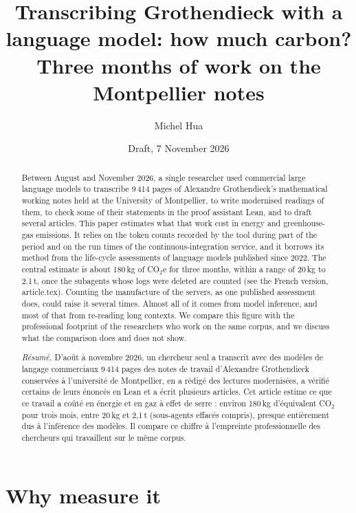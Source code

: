 \documentclass[11pt,a4paper]{article}
\title{Transcribing Grothendieck with a language model: how much carbon?\\
\large Three months of work on the Montpellier notes}
\author{Michel Hua}
\date{Draft, 7 November 2026}
\begin{document}
\maketitle

\begin{abstract}
Between August and November 2026, a single researcher used commercial large language models to transcribe 9\,414 pages of Alexandre Grothendieck's mathematical working notes held at the University of Montpellier, to write modernised readings of them, to check some of their statements in the proof assistant Lean, and to draft several articles. This paper estimates what that work cost in energy and greenhouse-gas emissions. It relies on the token counts recorded by the tool during part of the period and on the run times of the continuous-integration service, and it borrows its method from the life-cycle assessments of language models published since 2022. The central estimate is about 180\,kg of CO$_2$e for three months, within a range of 20\,kg to 2.1\,t, once the subagents whose logs were deleted are counted (see the French version, article.tex). Counting the manufacture of the servers, as one published assessment does, could raise it several times. Almost all of it comes from model inference, and most of that from re-reading long contexts. We compare this figure with the professional footprint of the researchers who work on the same corpus, and we discuss what the comparison does and does not show.
\end{abstract}

\begin{abstract}
\textit{Résumé.} D'août à novembre 2026, un chercheur seul a transcrit avec des modèles de langage commerciaux 9\,414 pages des notes de travail d'Alexandre Grothendieck conservées à l'université de Montpellier, en a rédigé des lectures modernisées, a vérifié certains de leurs énoncés en Lean et a écrit plusieurs articles. Cet article estime ce que ce travail a coûté en énergie et en gaz à effet de serre : environ 180\,kg d'équivalent CO$_2$ pour trois mois, entre 20\,kg et 2,1\,t (sous-agents effacés compris), presque entièrement dus à l'inférence des modèles. Il compare ce chiffre à l'empreinte professionnelle des chercheurs qui travaillent sur le même corpus.
\end{abstract}

\section{Why measure it}
\end{document}
